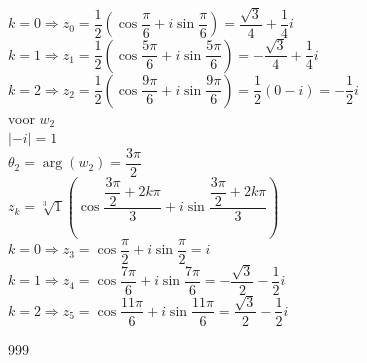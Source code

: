 \documentclass[a4paper]{article}
\begin{document}
$k=0 \Rightarrow z_0 = \dfrac{1}{2} \left( \cos \dfrac{\pi}{6} + i \sin \dfrac{\pi}{6} \right) = \dfrac{\sqrt{3}}{4} + \dfrac{1}{4}i$\\


$k=1 \Rightarrow z_1 = \dfrac{1}{2} \left( \cos \dfrac{5\pi}{6} + i \sin \dfrac{5\pi}{6} \right) = -\dfrac{\sqrt{3}}{4} + \dfrac{1}{4}i$\\


$k=2 \Rightarrow z_2 = \dfrac{1}{2} \left( \cos \dfrac{9\pi}{6} + i \sin \dfrac{9\pi}{6} \right) = \dfrac{1}{2} (0 - i) = -\dfrac{1}{2}i$\\

voor $w_2$\\

$\left|-i\right| = 1$\\

$\theta_2 = \arg(w_2) = \dfrac{3\pi}{2}$ \\


$z_k = \sqrt[3]{1} \left( \cos \dfrac{\dfrac{3\pi}{2} + 2k\pi}{3} + i \sin \dfrac{\dfrac{3\pi}{2} + 2k\pi}{3} \right)$\\


$k=0 \Rightarrow z_3 = \cos \dfrac{\pi}{2} + i \sin \dfrac{\pi}{2} = i$\\


$k=1 \Rightarrow z_4 = \cos \dfrac{7\pi}{6} + i \sin \dfrac{7\pi}{6} = -\dfrac{\sqrt{3}}{2} - \dfrac{1}{2}i$\\


$k=2 \Rightarrow z_5 = \cos \dfrac{11\pi}{6} + i \sin \dfrac{11\pi}{6} = \dfrac{\sqrt{3}}{2} - \dfrac{1}{2}i$\\
\begin{thebibliography}{999}
\end{thebibliography}
\end{document}

